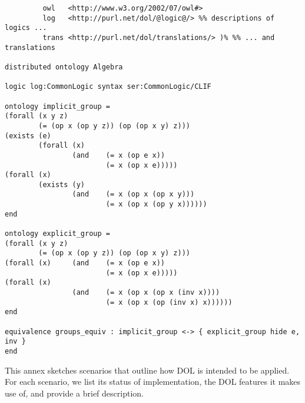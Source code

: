 \documentclass[%
\ifpretendfinal
final%
\else
draft%
\fi,
a4paper,
wd]{isov2}
\begin{document}

\begin{lstlisting}[basicstyle=\ttfamily,language=dolText,morekeywords={props,ObjectProperty,Class,DisjointUnionOf,SubClassOf,Characteristics,Transitive,Asymmetric,SubPropertyOf,DisjointClasses,EquivalentTo,inverse,only,forall,iff,if,or,exists,bridge,distributed},escapechar=@,mathescape]
%prefix( :     <http://www.example.org/alignment#>
         owl   <http://www.w3.org/2002/07/owl#>
         log   <http://purl.net/dol/@logic@/> %% descriptions of logics ...
         trans <http://purl.net/dol/translations/> )% %% ... and translations

distributed ontology Algebra

logic log:CommonLogic syntax ser:CommonLogic/CLIF

ontology implicit_group =
(forall (x y z)
        (= (op x (op y z)) (op (op x y) z)))
(exists (e)
        (forall (x)
                (and    (= x (op e x))
                        (= x (op x e)))))
(forall (x)
        (exists (y)
                (and    (= x (op x (op x y)))
                        (= x (op x (op y x))))))
end

ontology explicit_group =
(forall (x y z)
        (= (op x (op y z)) (op (op x y) z)))
(forall (x)     (and    (= x (op e x))
                        (= x (op x e)))))
(forall (x)
                (and    (= x (op x (op x (inv x))))
                        (= x (op x (op (inv x) x))))))
end

equivalence groups_equiv : implicit_group <-> { explicit_group hide e, inv }
end

\end{lstlisting}


This annex sketches scenarios that outline how DOL is intended to be applied.  For each scenario, we list its status of implementation, the DOL features it makes use of, and provide a brief description.
\end{document}
